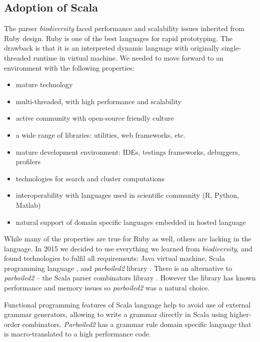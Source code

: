 \documentclass{bmcart}
\begin{document}
\subsection*{Adoption of Scala}

The parser \textit{biodiversity} faced performance and scalability issues
inherited from Ruby design. Ruby is one of the best languages for rapid
prototyping. The drawback is that it is an interpreted dynamic language with
originally single-threaded runtime in virtual machine. We needed to move
forward to an environment with the following properties:

\begin{itemize}
    \item mature technology
    \item multi-threaded, with high performance and scalability
    \item active community with open-source friendly culture
    \item a wide range of libraries: utilities, web frameworks, etc.
    \item mature development environment: IDEs, testings frameworks,
    debuggers, profilers
    \item technologies for search and cluster computations
    \item interoperability with languages used in scientific community (R,
    Python, Matlab)
    \item natural support of domain specific languages embedded in hosted
    language
\end{itemize}

While many of the properties are true for Ruby as well, others are lacking in
the language. In 2015 we decided to use everything we learned from
\textit{biodiversity}, and found technologies to fulfil all requirements: Java
virtual machine, Scala programming language \cite{odersky2004overview}, and
\textit{parboiled2} library \cite{parboiled2}. There is an alternative to
\textit{parboiled2} -- the Scala parser combinators library
\cite{moors2008parser}. However the library has known performance and memory
issues so \textit{parboiled2} was a natural choice.

Functional programming features of Scala language help to avoid use of
external grammar generators, allowing to write a grammar directly in Scala
using higher-order combinators. \textit{Parboiled2} has a grammar rule domain
specific language that is macro-translated
\cite{Burmako:2013:SML:2489837.2489840} to a high performance code.
\end{document}
